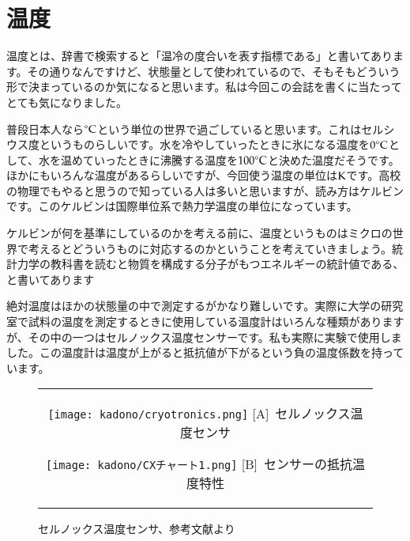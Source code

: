 \documentclass[10pt,b5paper,papersize,dvipdfmx]{jsbook}
\begin{document}
\section{温度}
温度とは、辞書で検索すると「温冷の度合いを表す指標である」と書いてあります。その通りなんですけど、状態量として使われているので、そもそもどういう形で決まっているのか気になると思います。私は今回この会誌を書くに当たってとても気になりました。\par 
普段日本人なら$^\circ \rm{C}$という単位の世界で過ごしていると思います。これはセルシウス度というものらしいです。水を冷やしていったときに氷になる温度を$0 ^\circ \rm{C}$として、水を温めていったときに沸騰する温度を$100 ^\circ \rm{C}$と決めた温度だそうです。ほかにもいろんな温度があるらしいですが、今回使う温度の単位は$\rm{K}$です。高校の物理でもやると思うので知っている人は多いと思いますが、読み方はケルビンです。このケルビンは国際単位系で熱力学温度の単位になっています。\par
ケルビンが何を基準にしているのかを考える前に、温度というものはミクロの世界で考えるとどういうものに対応するのかということを考えていきましょう。統計力学の教科書を読むと物質を構成する分子がもつエネルギーの統計値である、と書いてあります\par
絶対温度はほかの状態量の中で測定するがかなり難しいです。実際に大学の研究室で試料の温度を測定するときに使用している温度計はいろんな種類がありますが、その中の一つはセルノックス温度センサーです。私も実際に実験で使用しました。この温度計は温度が上がると抵抗値が下がるという負の温度係数を持っています。
\begin{figure}[htbp]
  \begin{center}
      \begin{tabular}{c}
      \begin{minipage}{0.5\hsize}
          \begin{center}
          \texttt{[image: kadono/cryotronics.png]}
          \hspace{1.6cm} [A]\ セルノックス温度センサ
          \end{center}
      \end{minipage}
      \begin{minipage}{0.5\hsize}
          \begin{center}
          \texttt{[image: kadono/CXチャート1.png]}
          \hspace{1.6cm} [B]\ センサーの抵抗温度特性
          \end{center}
      \end{minipage}
  
      \end{tabular}
      \caption{セルノックス温度センサ、参考文献\cite{ondo}より}
      \label{fig:cryotronics}
  \end{center}
\end{figure}
\end{document}
